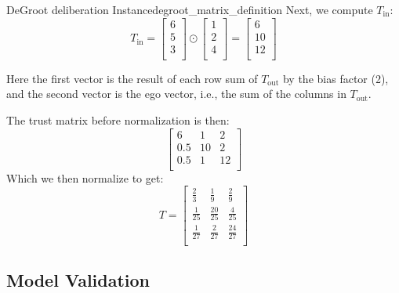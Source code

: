 \begin{example}{DeGroot deliberation Instance}{degroot_matrix_definition}
	Next, we compute $T_{\text{in}}$:
	$$T_{\text{in}} = \begin{bmatrix}
			6 \\
			5 \\
			3 \\
		\end{bmatrix} \odot
		\begin{bmatrix}
			1 \\
			2 \\
			4 \\
		\end{bmatrix} = \begin{bmatrix}
			6  \\
			10 \\
			12 \\
		\end{bmatrix} $$

	Here the first vector is the result of each row sum of $T_{\text{out}}$ by the bias factor (2), and the second vector is the ego vector, i.e., the sum of the columns in $T_{\text{out}}$.

	The trust matrix before normalization is then:
	$$\begin{bmatrix}
			6   & 1  & 2  \\
			0.5 & 10 & 2  \\
			0.5 & 1  & 12 \\
		\end{bmatrix}$$
	Which we then normalize to get:
	$$T = \begin{bmatrix}
			\frac{2}{3}  & \frac{1}{9}   & \frac{2}{9}   \\
			\frac{1}{25} & \frac{20}{25} & \frac{4}{25}  \\
			\frac{1}{27} & \frac{2}{27}  & \frac{24}{27} \\
		\end{bmatrix}
	$$
\end{example}



\subsection{Model Validation}

